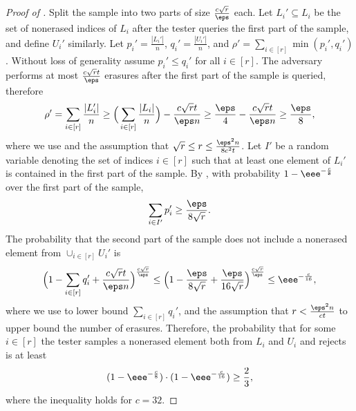 \documentclass{toc}
\begin{document}
\begin{proof}[Proof of ]
 Split the sample into two parts of size $\frac{c\sqrt{r}}{\eps}$ each. Let $L_i' \subseteq L_i$ be the set of nonerased indices of $L_i$ after the tester queries the first part of the sample, and define $U_i'$ similarly. Let $p_i' = \frac{|L_i' |}{n}$, $q_i' = \frac{|U_i' |}{n}$, and $\rho' = \sum_{i \in [r]} \min(p_i', q_i')$. Without loss of generality assume $p_i' \leq q_i'
$ for all $i \in [r]$. The adversary performs at most $\frac{c\sqrt{r}t}{\eps}$ erasures after the first part of the sample is queried, therefore 
\begin{equation*}
    \rho' = \sum_{i \in [r]} \frac{|L_i' |}{n} \geq  \Big(\sum_{i \in [r]} \frac{|L_i |}{n}\Big) - \frac{c\sqrt{r}t}{\eps n} \geq \frac{\eps}{4} - \frac{c\sqrt{r}t}{\eps n} \geq \frac{\eps}{8},
\end{equation*}
where we use  and the assumption that $\sqrt{r} \leq r \leq \frac{\eps^2 n}{8c^2 t}$.
Let $I'$ be a random variable denoting the set of indices $i \in [r]$ such that at least one element of $L_i'$ is contained in the first part of the sample. 
%
By , with probability $1- \eee^{-\frac{c}{8}}$ over the first part of the sample,
\begin{equation}\label{eq:pi}
     \sum_{i \in I'} p_i' \geq \frac{\eps}{8\sqrt{r}}.
\end{equation}
The probability that the second part of the sample does not include a nonerased element from $\cup_{i \in [r]} U_i'$ is
\begin{equation*}
    \Big ( 1 - \sum_{i\in [r]} q_i' + \frac{c\sqrt{r}t}{\eps n} \Big )^\frac{c\sqrt{r}}{\eps} \leq \Big ( 1 -  \frac{\eps}{8\sqrt{r}} + \frac{\eps}{16\sqrt{r}} \Big )^\frac{c\sqrt{r}}{\eps} \leq \eee^{-\frac{c}{16}},
\end{equation*}
where we use  to lower bound $\sum_{i\in [r]} q_i'$, and the assumption that $r < \frac{\eps^2 n}{ct}$ to upper bound the number of erasures. 
Therefore, the probability that for some $i \in [r]$ the tester samples a nonerased element both from $L_i$ and $U_i$ and rejects is at least
\begin{equation*}
 (1 - \eee^{-\frac{c}{8}}) \cdot (1 - \eee^{-\frac{c}{16}})\geq \frac{2}{3},
\end{equation*}
where the inequality holds for  $c= 32$. 
\end{proof}

%
%
\end{document}
